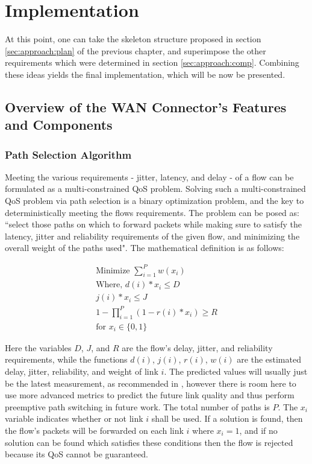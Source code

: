\chapter{Implementation}
\label{cha:impl}

At this point, one can take the skeleton structure proposed in section \ref{sec:approach:plan} of the previous chapter, and superimpose the other requirements which were determined in section \ref{sec:approach:comp}. Combining these ideas yields the final implementation, which will be now be presented.


\section{Overview of the WAN Connector's Features and Components}
\label{sec:approach:arch}

\subsection{Path Selection Algorithm}

Meeting the various requirements - jitter, latency, and delay - of a flow can be formulated as a multi-constrained QoS problem. Solving such a multi-constrained QoS problem via path selection is a binary optimization problem, and the key to deterministically meeting the flows requirements. The problem can be posed as: “select those paths on which to forward packets while making sure to satisfy the latency, jitter and reliability requirements of the given flow, and minimizing the overall weight of the paths used". The mathematical definition is as follows:

\begin{gather}
\label{algorithm}
\text{Minimize } \sum_{i=1}^{P}w(x_i) \\
\text{Where,   } d(i) * x_i\le D \\
j(i) * x_i \le J \\
1 - \prod_{i=1}^{P}{ ( 1- r(i) * x_i ) } \ge R  \\
\text{for } x_i \in \{0,1\}
\end{gather}

Here the variables $D$, $J$, and $R$ are the flow's delay, jitter, and reliability requirements, while the functions $d(i)$, $j(i)$, $r(i)$, $w(i)$ are the estimated delay, jitter, reliability, and weight of link $i$. The predicted values will usually just be the latest measurement, as recommended in \cite{akella2008performance}, however there is room here to use more advanced metrics to predict the future link quality and thus perform preemptive path switching in future work. The total number of paths is $P$. The $x_i$ variable indicates whether or not link $i$ shall be used. If a solution is found, then the flow's packets will be forwarded on each link $i$ where $x_i = 1$, and if no solution can be found which satisfies these conditions then the flow is rejected because its QoS cannot be guaranteed.


